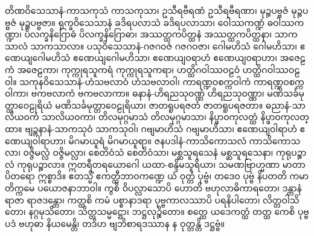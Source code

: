 {တိဏဝိသေသာနံ-ကာသကုသံ ကာသကုသာ၊ ဥသီရဗီရဏံ ဥသီရဗီရဏာ၊ မုဉ္ဇပဗ္ဗဇံ မုဉ္ဇပဗ္ဗဇံ မုဉ္ဇပဗ္ဗဇာ။ ရုက္ခဝိသေသာနံ ခဒိရပလာသံ ခဒိရပလာသာ၊ ဝေါဿကဏ္ဍံ ဓဝါဿကဏ္ဍာ၊ ပိလက္ခနိဂြောဓံ ပိလက္ခနိဂြောဓာ၊ အဿတ္ထကပိတ္ထနံ အဿတ္ထကပိတ္ထနာ၊ သာကသာလံ သာကသာလာ။ ပသုဝိသေသာနံ-ဂဇဂဝဇံ ဂဇဂဝဇာ၊ ဂေါမဟိသံ ဂေါမဟိသာ၊ ဧဏေယျဂေါမဟိသံ ဧဏေယျဂေါမဟိသာ၊ ဧဏေယျဝရာဟံ ဧဏေယျဝရာဟာ၊ အဇေဠကံ အဇေဠကာ၊ ကုက္ကုရသူကရံ ကုက္ကုရသူကရာ၊ ဟတ္ထိဂဝါဿဝဠဝံ ဟတ္ထိဂဝါဿဝဠဝါ။ သကုနဝိသေသာနံ-ဟံသဗလာဝံ ဟံသဗလာဝါ၊ ကာရဏ္ဍဝစက္ကဝါကံ ကာရဏ္ဍဝစက္ကဝါကာ၊ ဗကဗလာကံ ဗကဗလာကာ။ ဓနာနံ-ဟိရညသုဝဏ္ဏံ ဟိရညသုဝဏ္ဏာ၊ မဏိသင်္ခမုတ္တာဝေဠုရိယံ မဏိသင်္ခမုတ္တာဝေဠုရိယာ၊ ဇာတရူပရဇတံ ဇာတရူပရဇတာ။ ဓညာနံ-သာလိယဝကံ သာလိယဝကာ၊ တိလမုဂ္ဂမာသံ တိလမုဂ္ဂမာသာ၊ နိပ္ဖာဝကုလတ္ထံ နိပ္ဖာဝကုလတ္ထာ။ ဗျဉ္ဇနာနံ-သာကသုဝံ သာကသုဝါ၊ ဂဗျမာဟိသံ ဂဗျမာဟိသာ၊ ဧဏေယျဝါရာဟံ ဧဏေယျဝါရာဟာ၊ မိဂမာယူရံ မိဂမာယူရာ။ ဇနပဒါနံ-ကာသိကောသလံ ကာသိကောသလာ၊ ဝဇ္ဇိမလ္လံ ဝဇ္ဇိမလ္လာ၊ စေတိဝံသံ စေတိဝံသာ၊ မစ္ဆသူရသေနံ မစ္ဆသူရသေနာ၊ ကုရုပဉ္စာလံ ကုရုပဉ္စာလာ။ ဣတရီတရယောဂေါ ယထာ-စန္ဒိမသူရိယာ၊ သမဏဗြာဟ္မဏာ မာတာပိတရော ဣစ္စာဒိ။
ဧတသ္မိံ ဧကတ္ထီဘာဝကဏ္ဍေ ယံ ဝုတ္တံ ပုဗ္ဗံ၊ တဒေဝ ပုဗ္ဗံ နိပတတိ ကမာတိက္ကမေ ပယောဇနာဘာဝါ။ ကွစိ ဝိပလ္လာသောပိ ဟောတိ ဗဟုလာဓိကာရတော၊ ဒန္တာနံ ရာဇာ ရာဇဒန္တော၊ ကတ္ထစိ ကမံ ပစ္စာနာဒရာ ပုဗ္ဗကာလဿာပိ ပရနိပါတော၊ လိတ္တဝါသိတော၊ နဂ္ဂမုသိတော၊ သိတ္တသမ္မဋ္ဌော၊ ဘဋ္ဌလုဉ္စိတော။ စတ္ထေ ယဒေကတ္ထံ တတ္ထ ကေစိ ပုဗ္ဗပဒံ ဗဟုဓာ နိယမေန္တိ၊ တဒိဟ ဗျဘိစာရဒဿာန န ဝုတ္တန္တိ ဒဋ္ဌဗ္ဗံ။}







